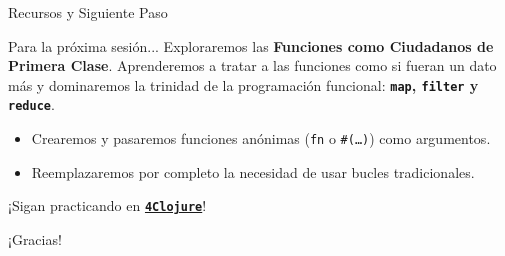 \documentclass{beamer}
\begin{document}
\begin{frame}{Recursos y Siguiente Paso}
    \begin{block}{Para la próxima sesión...}
        Exploraremos las \textbf{Funciones como Ciudadanos de Primera Clase}. 
        Aprenderemos a tratar a las funciones como si fueran un dato más y dominaremos la trinidad de la programación funcional: \textbf{\texttt{map}, \texttt{filter} y \texttt{reduce}}.
    \end{block}

    \vspace{0.3cm}
    \begin{itemize}
        \item Crearemos y pasaremos funciones anónimas (\texttt{fn} o \texttt{\#(…)}) como argumentos.
        \item Reemplazaremos por completo la necesidad de usar bucles tradicionales.
    \end{itemize}

    \vspace{0.4cm}
    \begin{center}
        ¡Sigan practicando en \href{https://4clojure.oxal.org/}{\textbf{\texttt{4Clojure}}}!
    \end{center}
\end{frame}

\begin{emptyframe}
    ¡Gracias!
    \figure
\end{emptyframe}
\end{document}
